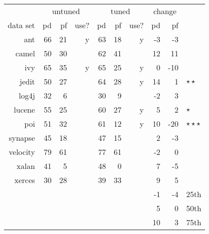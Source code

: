     {\scriptsize
\begin{tabular}{r|rrr|rrr|rr|l}
  & \multicolumn{3}{c|}{untuned} & \multicolumn{3}{c|}{tuned} & \multicolumn{2}{c|}{change}\\
  \cline{2-9}
data set & pd & pf & use? & pd & pf & use? & pd & pf\\\cline{1-9}
ant & 66 & 21 & y & 63 & 18 & y & -3 & -3\\
camel & 50 & 30 &   & 62 & 41 &   & 12 & 11\\
ivy & 65 & 35 & y & 65 & 25 & y & 0 & -10\\
jedit & 50 & 27 &   & 64 & 28 & y & 14 & 1&$\star\star$\\
log4j & 32 & 6 &   & 30 & 9 &   & -2 & 3\\
lucene & 55 & 25 &   & 60 & 27 & y & 5 & 2&$\star$\\
poi & 51 & 32 &   & 61 & 12 & y & 10 & -20&$\star\star\star$\\
synapse & 45 & 18 &   & 47 & 15 &   & 2 & -3\\
velocity & 79 & 61 &   & 77 & 61 &   & -2 & 0\\
xalan & 41 & 5 &   & 48 & 0 &   & 7 & -5\\
xerces & 30 & 28 &   & 39 & 33 &   & 9 & 5\\\hline
  \multicolumn{5}{c}{~} &    &  & -1 & -4& 25th\\
\multicolumn{5}{c}{~}   &   &   & 5 & 0 & 50th\\
 \multicolumn{5}{c}{~}  &            & & 10 & 3 & 75th\\
\end{tabular}
}
